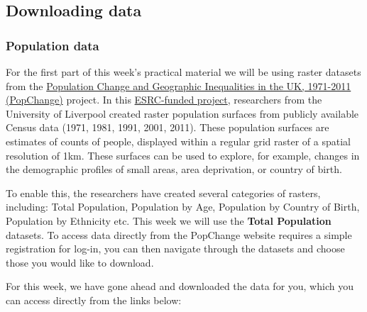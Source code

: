 \documentclass[
]{book}
\begin{document}
\hypertarget{downloading-data-w09}{%
\subsection{Downloading data}\label{downloading-data-w09}}

\hypertarget{population-data-1}{%
\subsubsection{Population data}\label{population-data-1}}

For the first part of this week's practical material we will be using raster datasets from the \href{https://www.liverpool.ac.uk/geography-and-planning/research/popchange/introduction/}{Population Change and Geographic Inequalities in the UK, 1971-2011 (PopChange)} project. In this \href{https://esrc.ukri.org/research/our-research/secondary-data-analysis-initiative/}{ESRC-funded project}, researchers from the University of Liverpool created raster population surfaces from publicly available Census data (1971, 1981, 1991, 2001, 2011). These population surfaces are estimates of counts of people, displayed within a regular grid raster of a spatial resolution of 1km. These surfaces can be used to explore, for example, changes in the demographic profiles of small areas, area deprivation, or country of birth.

To enable this, the researchers have created several categories of rasters, including: Total Population, Population by Age, Population by Country of Birth, Population by Ethnicity etc. This week we will use the \textbf{Total Population} datasets. To access data directly from the PopChange website requires a simple registration for log-in, you can then navigate through the datasets and choose those you would like to download.

For this week, we have gone ahead and downloaded the data for you, which you can access directly from the links below:
\end{document}
